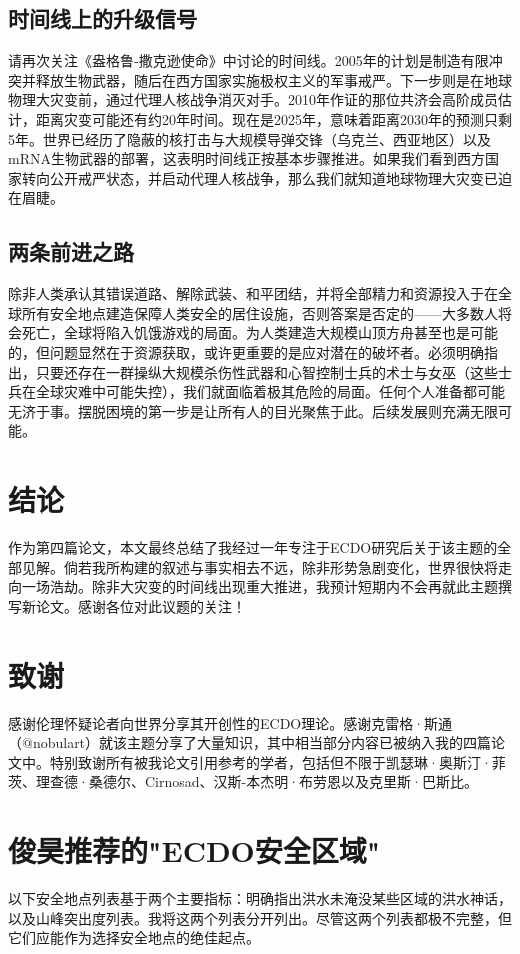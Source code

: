 \documentclass[10pt,twocolumn,letterpaper]{article}
\begin{document}
\subsection{时间线上的升级信号}

请再次关注《盎格鲁-撒克逊使命》中讨论的时间线。2005年的计划是制造有限冲突并释放生物武器，随后在西方国家实施极权主义的军事戒严。下一步则是在地球物理大灾变前，通过代理人核战争消灭对手。2010年作证的那位共济会高阶成员估计，距离灾变可能还有约20年时间。现在是2025年，意味着距离2030年的预测只剩5年。世界已经历了隐蔽的核打击与大规模导弹交锋（乌克兰、西亚地区）以及mRNA生物武器的部署，这表明时间线正按基本步骤推进。如果我们看到西方国家转向公开戒严状态，并启动代理人核战争，那么我们就知道地球物理大灾变已迫在眉睫。

\subsection{两条前进之路}

除非人类承认其错误道路、解除武装、和平团结，并将全部精力和资源投入于在全球所有安全地点建造保障人类安全的居住设施，否则答案是否定的——大多数人将会死亡，全球将陷入饥饿游戏的局面。为人类建造大规模山顶方舟甚至也是可能的，但问题显然在于资源获取，或许更重要的是应对潜在的破坏者。必须明确指出，只要还存在一群操纵大规模杀伤性武器和心智控制士兵的术士与女巫（这些士兵在全球灾难中可能失控），我们就面临着极其危险的局面。任何个人准备都可能无济于事。摆脱困境的第一步是让所有人的目光聚焦于此。后续发展则充满无限可能。
\section{结论}

作为第四篇论文，本文最终总结了我经过一年专注于ECDO研究后关于该主题的全部见解。倘若我所构建的叙述与事实相去不远，除非形势急剧变化，世界很快将走向一场浩劫。除非大灾变的时间线出现重大推进，我预计短期内不会再就此主题撰写新论文。感谢各位对此议题的关注！

\section{致谢}
感谢伦理怀疑论者\cite{0}向世界分享其开创性的ECDO理论。感谢克雷格·斯通（@nobulart）\cite{56}就该主题分享了大量知识，其中相当部分内容已被纳入我的四篇论文中。特别致谢所有被我论文引用参考的学者，包括但不限于凯瑟琳·奥斯汀·菲茨\cite{55}、理查德·桑德尔、Cirnosad\cite{24}、汉斯-本杰明·布劳恩\cite{57}以及克里斯·巴斯比。

\section{俊昊推荐的"ECDO安全区域"}
以下安全地点列表基于两个主要指标：明确指出洪水未淹没某些区域的洪水神话，以及山峰突出度列表。我将这两个列表分开列出。尽管这两个列表都极不完整，但它们应能作为选择安全地点的绝佳起点。
\end{document}
